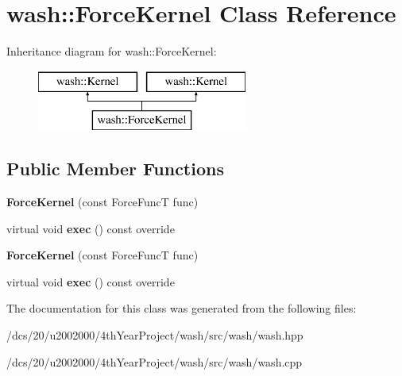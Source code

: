 \hypertarget{classwash_1_1ForceKernel}{}\section{wash\+:\+:Force\+Kernel Class Reference}
\label{classwash_1_1ForceKernel}
Inheritance diagram for wash\+:\+:Force\+Kernel\+:\begin{figure}[H]
\begin{center}
\leavevmode
\includegraphics[height=2.000000cm]{classwash_1_1ForceKernel}
\end{center}
\end{figure}
\subsection*{Public Member Functions}
\begin{DoxyCompactItemize}
\item 
\mbox{\label{classwash_1_1ForceKernel_a5dd87d8036d74c210c51fb6aa97a3de8}} 
{\bfseries Force\+Kernel} (const Force\+FuncT func)
\item 
\mbox{\label{classwash_1_1ForceKernel_aa815514d4e9af5ebb056dbe8f1d5a720}} 
virtual void {\bfseries exec} () const override
\item 
\mbox{\label{classwash_1_1ForceKernel_a5dd87d8036d74c210c51fb6aa97a3de8}} 
{\bfseries Force\+Kernel} (const Force\+FuncT func)
\item 
\mbox{\label{classwash_1_1ForceKernel_ac3c13c5d8d50e53283e6d5b5806a727d}} 
virtual void {\bfseries exec} () const override
\end{DoxyCompactItemize}


The documentation for this class was generated from the following files\+:\begin{DoxyCompactItemize}
\item 
/dcs/20/u2002000/4th\+Year\+Project/wash/src/wash/wash.\+hpp\item 
/dcs/20/u2002000/4th\+Year\+Project/wash/src/wash/wash.\+cpp\end{DoxyCompactItemize}
